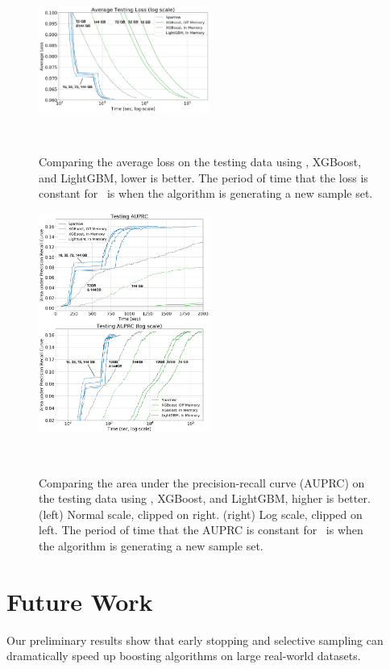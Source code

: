 \begin{figure}[t]
    \centering
    \includegraphics[width=0.5\textwidth]{figs/splice-loss2m.png}
    \caption{Comparing the average loss on the testing data using \Sparrow, XGBoost, and LightGBM, lower is better.
        The period of time that the loss is constant for \Sparrow\ is when the algorithm is generating a new sample set.}~\label{fig:loss}
\end{figure}



\begin{figure}[t]
    \centering
    \includegraphics[width=0.5\textwidth]{figs/splice-auprc2m.png}
    \caption{Comparing the area under the precision-recall curve (AUPRC) on the testing data
    using \Sparrow, XGBoost, and LightGBM, higher is better.
    (left) Normal scale, clipped on right.
    (right) Log scale, clipped on left.
    The period of time that the AUPRC is constant for \Sparrow\ is when the algorithm is generating a new sample set.}~\label{fig:auprc}
\end{figure}


\section{Future Work}\label{sec:Conclusion}
Our preliminary results show that early stopping and selective
sampling can dramatically speed up boosting algorithms on large
real-world datasets.

